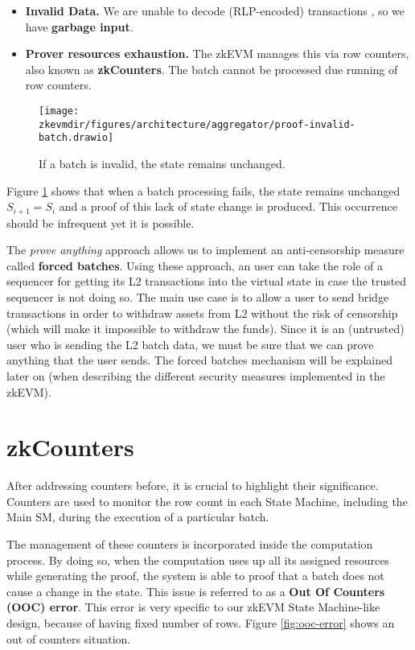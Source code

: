 \begin{itemize}
\item \textbf{Invalid Data.}
We are unable to decode (RLP-encoded) transactions , so we have \textbf{garbage input}.

\item \textbf{Prover resources exhaustion.}
The zkEVM manages this via row counters, also known as \textbf{zkCounters}. The batch cannot be processed due running of row counters.
\end{itemize}

\begin{figure}[H]
\centering
\texttt{[image: \\zkevmdir/figures/architecture/aggregator/proof-invalid-batch.drawio]}
\caption{If a batch is invalid, the state remains unchanged.}
\label{fig:invalid-batch}
\end{figure}

Figure \ref{fig:invalid-batch} shows that when a batch processing fails, the state remains unchanged $S_{i+1}=S_i$ and a proof of this lack of state change is produced. This occurrence should be infrequent yet it is possible.

The \textit{prove anything} approach allows us to implement an anti-censorship measure called \textbf{forced batches}. Using these approach, an user can take the role of a sequencer for getting its L2 transactions into the virtual state in case the trusted sequencer is not doing so. The main use case is to allow a user to send bridge transactions in order to withdraw assets from L2 without the risk of censorship (which will make it impossible to withdraw the funds). Since it is an (untrusted) user who is sending the L2 batch data, we must be sure that we can prove anything that the user sends. The forced batches mechanism will be explained later on (when describing the different security measures implemented in the zkEVM).



\section{zkCounters}

After addressing counters before, it is crucial to highlight their significance. Counters are used to monitor the row count in each State Machine, including the Main SM, during the execution of a particular batch.

The management of these counters is incorporated inside the computation process. By doing so, when the computation uses up all its assigned resources while generating the proof, the system is able to proof that a batch does not cause a change in the state. This issue is referred to as a \textbf{Out Of Counters (OOC) error}. This error is very specific to our zkEVM State Machine-like design, because of having fixed number of rows. Figure \ref{fig:ooc-error} shows an out of counters situation.

